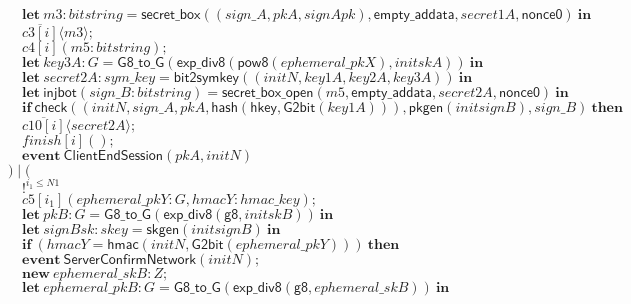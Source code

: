 \documentclass{article}
\newcommand{\cinput}[2]{{#1}({#2})}
\newcommand{\coutput}[2]{\overline{#1}\langle{#2}\rangle}
\newcommand{\kw}[1]{\mathbf{#1}}
\newcommand{\kwf}[1]{\mathsf{#1}}
\newcommand{\var}[1]{\mathit{#1}}
\newcommand{\kwt}[1]{\mathit{#1}}
\newcommand{\kwp}[1]{\mathit{#1}}
\newcommand{\kwc}[1]{\mathit{#1}}
\begin{document}
\begin{tabbing}
\>$\quad \kw{let}\ \var{m3}: \kwt{bitstring} = \kwf{secret{\_}box}(\kwf{}(\var{sign{\_}A}, \var{pkA}, \var{signApk}), \kwf{empty{\_}addata}, \var{secret1A}, \kwf{nonce0})\ \kw{in}$\\
\>$\quad \coutput{\kwc{c3}[\var{i}]}{\var{m3}};$\\
\>$\quad \cinput{\kwc{c4}[\var{i}]}{\var{m5}: \kwt{bitstring}};$\\
\>$\quad \kw{let}\ \var{key3A}: \kwt{G} = \kwf{G8{\_}to{\_}G}(\kwf{exp{\_}div8}(\kwf{pow8}(\var{ephemeral{\_}pkX}), \var{initskA}))\ \kw{in}$\\
\>$\quad \kw{let}\ \var{secret2A}: \kwt{sym{\_}key} = \kwf{bit2symkey}(\kwf{}(\var{initN}, \var{key1A}, \var{key2A}, \var{key3A}))\ \kw{in}$\\
\>$\quad \kw{let}\ \kwf{injbot}(\var{sign{\_}B}: \kwt{bitstring}) = \kwf{secret{\_}box{\_}open}(\var{m5}, \kwf{empty{\_}addata}, \var{secret2A}, \kwf{nonce0})\ \kw{in}$\\
\>$\quad \kw{if}\ \kwf{check}(\kwf{}(\var{initN}, \var{sign{\_}A}, \var{pkA}, \kwf{hash}(\kwf{hkey}, \kwf{G2bit}(\var{key1A}))), \kwf{pkgen}(\var{initsignB}), \var{sign{\_}B})\ \kw{then}$\\
\>$\quad \coutput{\kwc{c10}[\var{i}]}{\var{secret2A}};$\\
\>$\quad \cinput{\kwc{finish}[\var{i}]}{};$\\
\>$\quad \kw{event}\ \kwf{ClientEndSession}(\var{pkA}, \var{initN})$\\
\>$) \mid ($\\
\>$\quad !^{\var{i}_{1} \leq \kwp{N1}}$\\
\>$\quad \cinput{\kwc{c5}[\var{i}_{1}]}{\var{ephemeral{\_}pkY}: \kwt{G}, \var{hmacY}: \kwt{hmac{\_}key}};$\\
\>$\quad \kw{let}\ \var{pkB}: \kwt{G} = \kwf{G8{\_}to{\_}G}(\kwf{exp{\_}div8}(\kwf{g8}, \var{initskB}))\ \kw{in}$\\
\>$\quad \kw{let}\ \var{signBsk}: \kwt{skey} = \kwf{skgen}(\var{initsignB})\ \kw{in}$\\
\>$\quad \kw{if}\ (\var{hmacY}  =  \kwf{hmac}(\var{initN}, \kwf{G2bit}(\var{ephemeral{\_}pkY})))\ \kw{then}$\\
\>$\quad \kw{event}\ \kwf{ServerConfirmNetwork}(\var{initN});$\\
\>$\quad \kw{new}\ \var{ephemeral{\_}skB}: \kwt{Z};$\\
\>$\quad \kw{let}\ \var{ephemeral{\_}pkB}: \kwt{G} = \kwf{G8{\_}to{\_}G}(\kwf{exp{\_}div8}(\kwf{g8}, \var{ephemeral{\_}skB}))\ \kw{in}$\\

\end{tabbing}
\end{document}
